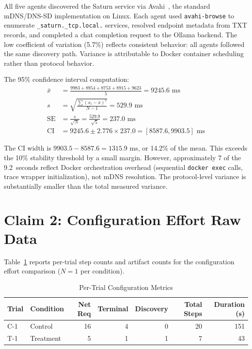 All five agents discovered the Saturn service via Avahi~\cite{avahi}, the standard mDNS/DNS-SD implementation on Linux. Each agent used \texttt{avahi-browse} to enumerate \texttt{\_saturn.\_tcp.local.} services, resolved endpoint metadata from TXT records, and completed a chat completion request to the Ollama backend. The low coefficient of variation (5.7\%) reflects consistent behavior: all agents followed the same discovery path. Variance is attributable to Docker container scheduling rather than protocol behavior.

The 95\% confidence interval computation:
\begin{align*}
\bar{x} &= \frac{9983 + 8954 + 8753 + 8915 + 9623}{5} = 9245.6 \text{ ms} \\
s &= \sqrt{\frac{\sum(x_i - \bar{x})^2}{N-1}} = 529.9 \text{ ms} \\
\text{SE} &= \frac{s}{\sqrt{N}} = \frac{529.9}{\sqrt{5}} = 237.0 \text{ ms} \\
\text{CI} &= 9245.6 \pm 2.776 \times 237.0 = [8587.6, 9903.5] \text{ ms}
\end{align*}

The CI width is $9903.5 - 8587.6 = 1315.9$ ms, or 14.2\% of the mean. This exceeds the 10\% stability threshold by a small margin. However, approximately 7 of the 9.2~seconds reflect Docker orchestration overhead (sequential \texttt{docker exec} calls, trace wrapper initialization), not mDNS resolution. The protocol-level variance is substantially smaller than the total measured variance.

\section{Claim 2: Configuration Effort Raw Data}

Table~\ref{tab:raw-c2} reports per-trial step counts and artifact counts for the configuration effort comparison ($N=1$ per condition).

\begin{table}[ht]
\centering
\caption{Per-Trial Configuration Metrics}
\label{tab:raw-c2}
\begin{tabular}{l l r r r r r}
\hline
\textbf{Trial} & \textbf{Condition} & \textbf{Net Req} & \textbf{Terminal} & \textbf{Discovery} & \textbf{Total Steps} & \textbf{Duration (s)} \\
\hline
C-1 & Control & 16 & 4 & 0 & 20 & 151 \\
T-1 & Treatment & 5 & 1 & 1 & 7 & 43 \\
\hline
\end{tabular}
\end{table}

